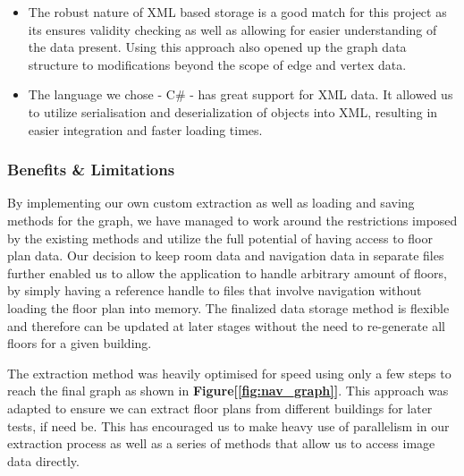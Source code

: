 \documentclass[12pt,a4paper]{report}
\begin{document}
\begin{itemize}

\item The robust nature of XML based storage is a good match for this project as its ensures validity checking as well as allowing for easier understanding of the data present. Using this approach also opened up the graph data structure to modifications beyond the scope of edge and vertex data. 
		
\item The language we chose - C\# - has great support for XML data. It allowed us to utilize serialisation and deserialization of objects into XML, resulting in easier integration and faster loading times.
\end{itemize}

\subsubsection{Benefits \& Limitations}
By implementing our own custom extraction as well as loading and saving methods for the graph, we have managed to work around the restrictions imposed by the existing methods and utilize the full potential of having access to floor plan data. Our decision to keep room data and navigation data in separate files further enabled us to allow the application to handle arbitrary amount of floors, by simply having a reference handle to files that involve navigation without loading the floor plan into memory. The finalized data storage method is flexible and therefore can be updated at later stages without the need to re-generate all floors for a given building.
\newline

The extraction method was heavily optimised for speed using only a few steps to reach the final graph as shown in \textbf{Figure[\ref{fig:nav_graph}]}. This approach was adapted to ensure we can extract floor plans from different buildings for later tests, if need be. This has encouraged us to make heavy use of parallelism in our extraction process as well as a series of methods that allow us to access image data directly. 
\newline
\end{document}
